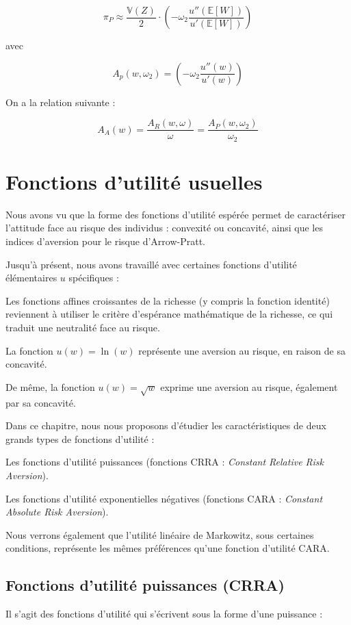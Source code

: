 \documentclass[a4paper, 12pt]{report}
\begin{document}
\[
\pi_P \approx \frac{\mathbb{V}(Z)}{2} \cdot \left( -\omega_2\frac{ u''(\mathbb{E}[W])}{u'(\mathbb{E}[W])}\right) 
\]

avec 

\[
A_p(w,\omega_2) = \left( -\omega_2\frac{ u''(w)}{u'(w)}\right) 
\]

On a la relation suivante :

\[
A_A(w)=\frac{A_R(w,\omega)}{\omega}=\frac{A_P(w,\omega_2)}{\omega_2}
\]

\chapter{Fonctions d'utilité usuelles}

Nous avons vu que la forme des fonctions d'utilité espérée permet de caractériser l'attitude face au risque des individus : convexité ou concavité, ainsi que les indices d'aversion pour le risque d'Arrow-Pratt.

Jusqu'à présent, nous avons travaillé avec certaines fonctions d'utilité élémentaires \( u \) spécifiques :

Les fonctions affines croissantes de la richesse (y compris la fonction identité) reviennent à utiliser le critère d'espérance mathématique de la richesse, ce qui traduit une neutralité face au risque.

La fonction \( u(w) = \ln(w) \) représente une aversion au risque, en raison de sa concavité.

De même, la fonction \( u(w) = \sqrt{w} \) exprime une aversion au risque, également par sa concavité.

Dans ce chapitre, nous nous proposons d'étudier les caractéristiques de deux grands types de fonctions d'utilité :

Les fonctions d'utilité puissances (fonctions CRRA : \textit{Constant Relative Risk Aversion}).

Les fonctions d'utilité exponentielles négatives (fonctions CARA : \textit{Constant Absolute Risk Aversion}).

Nous verrons également que l'utilité linéaire de Markowitz, sous certaines conditions, représente les mêmes préférences qu'une fonction d'utilité CARA.

\section{Fonctions d'utilité puissances (CRRA)}

Il s'agit des fonctions d'utilité qui s'écrivent sous la forme d'une puissance :
\end{document}
